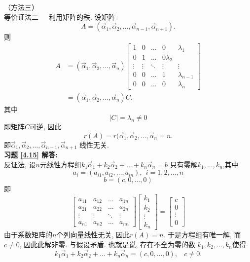 \documentclass[a4paper]{book}
\begin{document}
（方法三）\\
等价证法二\ \ \ 利用矩阵的秩. 设矩阵$$A=(\vec{\alpha}_1,\vec{\alpha}_2,\dots,\vec{\alpha}_{n-1},\vec{\alpha}_{n+1}).$$ 则
\begin{displaymath}\begin{aligned}A&=(\vec{\alpha}_1,\vec{\alpha}_2,\dots,\vec{\alpha}_n)\begin{bmatrix}1&0&\dots&0&\lambda_1\\0&1&\dots&0\lambda_2\\
\vdots&\vdots&\ddots&\vdots&\vdots\\0&0&\dots&1&
\lambda_{n-1} \\0&0&\dots&0&\lambda_n\end{bmatrix}\\&=(\vec{\alpha}_1,\vec{\alpha}_2,\dots,\vec{\alpha}_n)C.\end{aligned}\end{displaymath}
其中$$|C|=\lambda_n\not=0$$即矩阵$C$可逆, 因此$$r(A)=r(\vec{\alpha}_1,\vec{\alpha}_2,\dots,\vec{\alpha}_n=n.$$
即$\vec{\alpha}_1,\vec{\alpha}_2,\dots,\vec{\alpha}_{n-1},\vec{\alpha}_{n+1}$ 线性无关.\\
\textbf{习题 \ref{4.15} 解答:}\\
反证法, 设$n$元线性方程组$k_1\vec{\alpha}_1+k_2\vec{\alpha}_2+\dots+k_n\vec{\alpha}_n=b$ 只有零解$k_1,\dots,k_n$,其中
$$a_i=(a_{i1},a_{i2},\dots,a_{in}),\ \ i=1,2,\dots,n$$
$$b=(c,0,\dots,0)$$
即
\begin{displaymath}\begin{bmatrix}a_{11}&a_{12}&\dots &a_{1n}\\a_{21}&a_{22}&\dots&a_{2n}\\ \vdots&\vdots&\ddots&\vdots\\ a_{n1}&a_{n2}&\dots&a_{nn}\end{bmatrix}
\begin{bmatrix}k_1\\k_2\\ \vdots\\ k_n\end{bmatrix}=\begin{bmatrix}c\\0\\ \vdots \\ 0\end{bmatrix}\end{displaymath}
由于系数矩阵的$n$个列向量线性无关, 因此$r(A)=n$. 于是方程组有唯一解, 而$c\not=0$, 因此此解非零. 与假设矛盾. 也就是说, 存在不全为零的数
$k_1,k_2,\dots,k_n$使得$$k_1\vec{\alpha}_1+k_2\vec{\alpha}_2+\dots+k_n\vec{\alpha}_n=(c,0,\dots,0),\ \ \ \ c\not=0.$$
\end{document}
